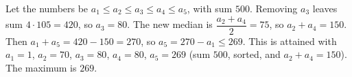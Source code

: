 Let the numbers be $a_1\le a_2\le a_3\le a_4\le a_5$, with sum $500$. Removing $a_3$ leaves sum $4\cdot105=420$, so $a_3=80$. The new median is $\dfrac{a_2+a_4}{2}=75$, so $a_2+a_4=150$. Then $a_1+a_5=420-150=270$, so $a_5=270-a_1\le269$. This is attained with $a_1=1$, $a_2=70$, $a_3=80$, $a_4=80$, $a_5=269$ (sum $500$, sorted, and $a_2+a_4=150$). The maximum is $\boxed{269}$.
